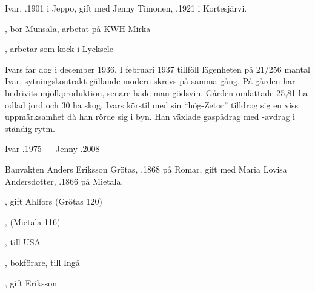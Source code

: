 Ivar, .1901 i Jeppo, gift med Jenny Timonen, .1921 i Kortesjärvi.
\begin{jhchildren}
  \item {}, bor Munsala, arbetat på KWH Mirka
  \item {}
  \item {}
  \item {}, arbetar som kock i Lycksele
\end{jhchildren}
Ivars far dog i december 1936. I februari 1937 tillföll lägenheten på 21/256 mantal Ivar, sytningskontrakt gällande modern skrevs på samma gång. På gården har bedrivits mjölkproduktion, senare hade man gödsvin. Gården omfattade 25,81 ha odlad jord och 30 ha skog. Ivars körstil med sin ``hög-Zetor'' tilldrog sig en viss uppmärksamhet då han rörde sig i byn. Han växlade gaspådrag med -avdrag i ständig rytm.

Ivar .1975  ---  Jenny .2008





Banvakten Anders Eriksson Grötas, .1868 på Romar, gift med Maria	Lovisa Andersdotter, .1866 på Mietala.
\begin{jhchildren}
  \item {}, gift Ahlfors (Grötas 120)
  \item {}
  \item {}, (Mietala 116)
  \item {}, till USA
  \item {}
  \item {}, bokförare, till Ingå
  \item {}, gift Eriksson
\end{jhchildren}

